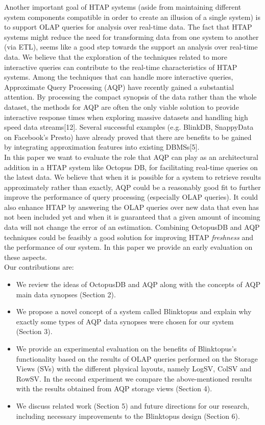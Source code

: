 \documentclass[10pt, conference, compsocconf]{IEEEtran}
\begin{document}
Another important goal of HTAP systems (aside from maintaining different system components compatible in order to create an illusion of a single system) is to support OLAP queries for analysis over real-time data. The fact that HTAP systems might reduce the need for transforming data from one system to another (via ETL), seems like a good step towards the support an analysis over real-time data. We believe that the exploration of the techniques related to more interactive queries can contribute to the real-time characteristics of HTAP systems. Among the techniques that can handle more interactive queries, Approximate Query Processing (AQP) have recently gained a substantial attention. By processing the compact synopsis of the data rather than the whole dataset, the methods for AQP are often the only viable solution to provide interactive response times when exploring massive datasets and handling high speed data streams[12]. Several successful examples (e.g. BlinkDB, SnappyData on Facebook's Presto) have already proved that there are benefits to be gained by integrating approximation features into existing DBMSs[5].\\
In this paper we want to evaluate the role that AQP can play as an architectural addition in a HTAP system like Octopus DB, for facilitating real-time queries on the latest data. 
We believe that when it is possible for a system to retrieve results approximately rather than exactly, AQP could be a reasonably good fit to further improve the performance of query processing (especially OLAP queries). It could also enhance HTAP by answering the OLAP queries over new data that even has not been included yet and when it is guaranteed that a given amount of incoming data will not change the error of an estimation. Combining OctopusDB and AQP techniques could be feasibly a good solution for improving HTAP \textit{freshness} and the performance of our system. In this paper we provide an early evaluation on these aspects.\\

Our contributions are:
\begin{itemize}
\vspace{0.05 cm}
\item{We review the ideas of OctopusDB and AQP along with the concepts of AQP main data synopses (Section 2).}
\item{We propose a novel concept of a system called Blinktopus and explain why exactly some types of AQP data synopses were chosen for our system (Section 3).}
\item{We provide an experimental evaluation on the benefits of Blinktopus's functionality based on the results of OLAP queries performed on the Storage Views (SVs) with the different physical layouts, namely LogSV, ColSV and RowSV. In the second experiment we compare the above-mentioned results with the results obtained from AQP storage views (Section 4).}
\item{We discuss related work (Section 5) and future directions for our research, including necessary improvements to the Blinktopus design (Section 6).}
\end{itemize}
\end{document}
